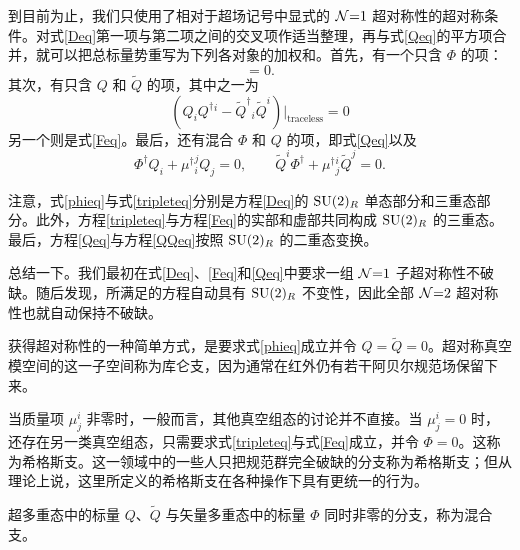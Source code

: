 到目前为止，我们只使用了相对于超场记号中显式的 $\mathcal{N}{=}1$ 超对称性的超对称条件。对式\eqref{Deq}第一项与第二项之间的交叉项作适当整理，再与式\eqref{Qeq}的平方项合并，就可以把总标量势重写为下列各对象的加权和。首先，有一个只含 $\Phi$ 的项：
\begin{equation}
[\Phi^\dagger,\Phi]=0.\label{phieq}
\end{equation}
其次，有只含 $Q$ 和 $\tilde Q$ 的项，其中之一为
\begin{equation}
(Q_i Q^\dagger{}^i-\tilde Q^\dagger{}_i \tilde Q^i)\big|_\text{traceless}=0\label{tripleteq}
\end{equation}
另一个则是式\eqref{Feq}。最后，还有混合 $\Phi$ 和 $Q$ 的项，即式\eqref{Qeq}以及
\begin{equation}
\Phi^\dagger Q_i +\mu^\dagger{}^j_i Q_j =0, \qquad \tilde Q^i \Phi^\dagger + \mu^\dagger{}^i_j \tilde Q^j=0 \label{QQeq}.
\end{equation}

注意，式\eqref{phieq}与式\eqref{tripleteq}分别是方程\eqref{Deq}的 $\mathop{\mathrm{SU}}(2)_R$ 单态部分和三重态部分。此外，方程\eqref{tripleteq}与方程\eqref{Feq}的实部和虚部共同构成 $\mathop{\mathrm{SU}}(2)_R$ 的三重态。最后，方程\eqref{Qeq}与方程\eqref{QQeq}按照 $\mathop{\mathrm{SU}}(2)_R$ 的二重态变换。

总结一下。我们最初在式\eqref{Deq}、\eqref{Feq}和\eqref{Qeq}中要求一组 $\mathcal{N}{=}1$ 子超对称性不破缺。随后发现，所满足的方程自动具有 $\mathop{\mathrm{SU}}(2)_R$ 不变性，因此全部 $\mathcal{N}{=}2$ 超对称性也就自动保持不破缺。

获得超对称性的一种简单方式，是要求式\eqref{phieq}成立并令 $Q=\tilde Q=0$。超对称真空模空间的这一子空间称为库仑支，因为通常在红外仍有若干阿贝尔规范场保留下来。

当质量项 $\mu^i_j$ 非零时，一般而言，其他真空组态的讨论并不直接。当 $\mu^i_j=0$ 时，还存在另一类真空组态，只需要求式\eqref{tripleteq}与式\eqref{Feq}成立，并令 $\Phi=0$。这称为希格斯支。这一领域中的一些人只把规范群完全破缺的分支称为希格斯支；但从理论上说，这里所定义的希格斯支在各种操作下具有更统一的行为。

超多重态中的标量 $Q$、$\tilde Q$ 与矢量多重态中的标量 $\Phi$ 同时非零的分支，称为混合支。

